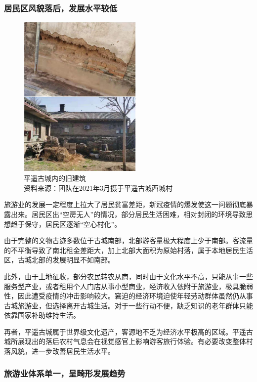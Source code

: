 \documentclass[UTF8]{ctexart}
\begin{document}
        \subsubsection{居民区风貌落后，发展水平较低}
        \begin{figure}[H]
        \centering
        \includegraphics[width=6cm]{建筑.jpg}
        \caption[plain]{平遥古城内的旧建筑\\资料来源：团队在2021年3月摄于平遥古城西城村}

        \end{figure}
        旅游业的发展一定程度上拉大了居民贫富差距，新冠疫情的爆发使这一问题彻底暴露出来。居民区出“空房无人”的情况，部分居民生活困难，相对封闭的环境导致思想趋于保守，居民区逐渐“空心村化”。
        
        由于完整的文物古迹多数位于古城南部，北部游客量极大程度上少于南部。客流量的不平衡导致了南北租金差距大，加上北部大面积为原始村落，属于本地居民生活区，古城北部的发展明显不如南部。
        
        此外，由于土地征收，部分农民转农从商，同时由于文化水平不高，只能从事一些服务型产业，或者租用个人门店从事小型商业，经济收入依附于旅游业，极具脆弱性，因此遭受疫情的冲击影响较大。窘迫的经济环境迫使年轻劳动群体虽然仍从事古城旅游业，但选择离开古城生活。对于一些行动不便，缺乏知识的老年群体只能依靠国家补助维持生活。
        
        再者，平遥古城属于世界级文化遗产，客源地不乏为经济水平极高的区域。平遥古城所展现出的落后农村气息会在视觉感官上影响游客旅行体验。有必要改变整体村落风貌，进一步改善居民生活水平。
        
        \subsubsection{旅游业体系单一，呈畸形发展趋势}
        
\end{document}

